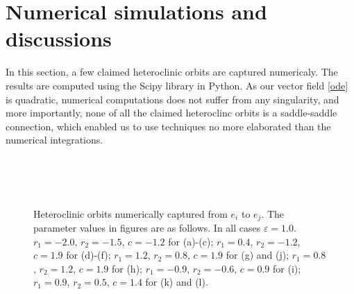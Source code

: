 \documentclass{amsart}
\theoremstyle{definition}
\numberwithin{equation}{section}
\begin{document}
\section{Numerical simulations and discussions}
In this section, a few claimed heteroclinic orbits are captured numericaly. The results are computed using the Scipy library in Python. As our vector field \eqref{ode} is quadratic, numerical computations does not suffer from any singularity, and more importantly, none of all the claimed heteroclinc orbits is a saddle-saddle connection, which enabled us to use techniques no more elaborated than the numerical integrations.

\begin{figure}[h]\label{fign}
\setcounter{subfigure}{0}
   \\ 
   \\ 
   \\ 
\caption{Heteroclinic orbits numerically captured from $e_i$ to $e_j$. The parameter values in figures are as follows. In all cases $\varepsilon=1.0$.\\$r_1=-2.0$, $r_2=-1.5$, $c=-1.2$ for (a)-(c); $r_1=0.4$, $r_2=-1.2$, $c=1.9$ for (d)-(f); $r_1=1.2$, $r_2=0.8$, $c=1.9$ for (g) and (j);  $r_1=0.8$, $r_2=1.2$, $c=1.9$ for (h); $r_1=-0.9$, $r_2=-0.6$, $c=0.9$ for (i); $r_1=0.9$, $r_2=0.5$, $c=1.4$ for (k) and (l).  }
\end{figure}
\end{document}
